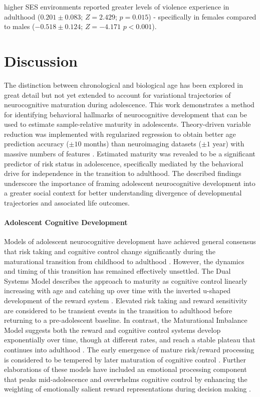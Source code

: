 \documentclass[utf8]{frontiersSCNS} %
\begin{document}
higher SES environments reported greater levels of violence experience in adulthood ($0.201\pm0.083$; $Z=2.429$; $p=0.015$) - specifically in females compared to males ($-0.518\pm0.124$;  $Z=-4.171$ $p<0.001$).
\\
\section{Discussion} The distinction between chronological and biological age has been explored in great detail but not yet extended to account for variational trajectories of neurocognitive maturation during adolescence. This work demonstrates a method for identifying behavioral hallmarks of neurocognitive development that can be used to estimate sample-relative maturity in adolescents. Theory-driven variable reduction was implemented with regularized regression to obtain better age prediction accuracy ($\pm 10$ months) than neuroimaging datasets ($\pm1$ year) with massive numbers of features \citep{cole2017predicting, franke2012brain}. Estimated maturity was revealed to be a significant predictor of risk status in adolescence, specifically mediated by the behavioral drive for independence in the transition to adulthood. The described findings underscore the importance of framing adolescent neurocognitive development into a greater social context for better understanding divergence of developmental trajectories and associated life outcomes.
\paragraph*{Adolescent Cognitive Development} Models of adolescent neurocognitive development have achieved general consensus that risk taking and cognitive control change significantly during the maturational transition from childhood to adulthood \citep{Steinberg2010}. However, the dynamics and timing of this transition has remained effectively unsettled. The Dual Systems Model describes the approach to maturity as cognitive control linearly increasing with age and catching up over time with the inverted u-shaped development of the reward system \citep{Steinberg2005}. Elevated risk taking and reward sensitivity are considered to be transient events in the transition to adulthood before returning to a pre-adolescent baseline. In contrast, the Maturational Imbalance Model suggests both the reward and cognitive control systems develop exponentially over time, though at different rates, and reach a stable plateau that continues into adulthood \citep{CaseyEtAl2008}. The early emergence of mature risk/reward processing is considered to be tempered by later maturation of cognitive control \citep{somerville2010developmental}. Further elaborations of these models have included an emotional processing component that peaks mid-adolescence and overwhelms cognitive control by enhancing the weighting of emotionally salient reward representations during decision making \citep{casey2019development}.
\end{document}
